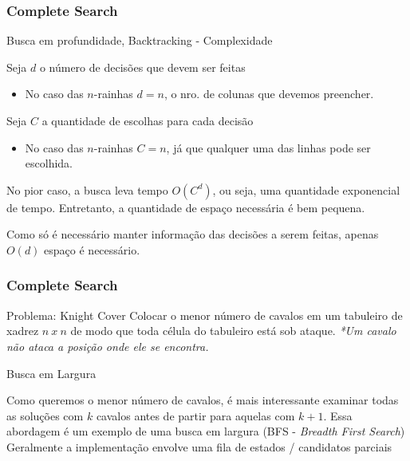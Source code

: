 \begin{frame}
\frametitle{Complete Search}

\begin{block}{Busca em profundidade, Backtracking - Complexidade}

\begin{itemize}
	\bitem Seja $d$ o número de decisões que devem ser feitas 
	\begin{itemize}
		\item[] \scriptsize{No caso das $n$-rainhas $d=n$, o nro. de colunas que devemos preencher.}
	\end{itemize}
	\bitem Seja $C$ a quantidade de escolhas para cada decisão
	\begin{itemize}
		\item[] \scriptsize{No caso das $n$-rainhas $C=n$, já que qualquer uma das linhas pode ser escolhida.}
	\end{itemize}
	\bitem No pior caso, a busca leva tempo $O(C^d)$, ou seja, uma quantidade exponencial de tempo.
	\bitem Entretanto, a quantidade de espaço necessária é bem pequena.
	\begin{itemize}
		\bitem Como só é necessário manter informação das decisões a serem feitas, apenas $O(d)$ espaço é necessário.
	\end{itemize}
\end{itemize}
\end{block}
\end{frame}

\begin{frame}
\frametitle{Complete Search}
\begin{block}{Problema: Knight Cover}
\scriptsize
Colocar o menor número de cavalos em um tabuleiro de xadrez $n\ x \ n$ de modo que toda célula do tabuleiro está sob ataque.
\tiny{\emph{*Um cavalo não ataca a posição onde ele se encontra.}}
\end{block}
\pause
\begin{block}{Busca em Largura}
\begin{itemize}[<+->]
	\bitem Como queremos o menor número de cavalos, é mais interessante examinar todas as soluções com $k$ cavalos
	antes de partir para aquelas com $k+1$.
	\bitem Essa abordagem é um exemplo de uma busca em largura (BFS - \emph{Breadth First Search})
	\bitem Geralmente a implementação envolve uma fila de estados / candidatos parciais
\end{itemize}
\end{block}
\end{frame}

